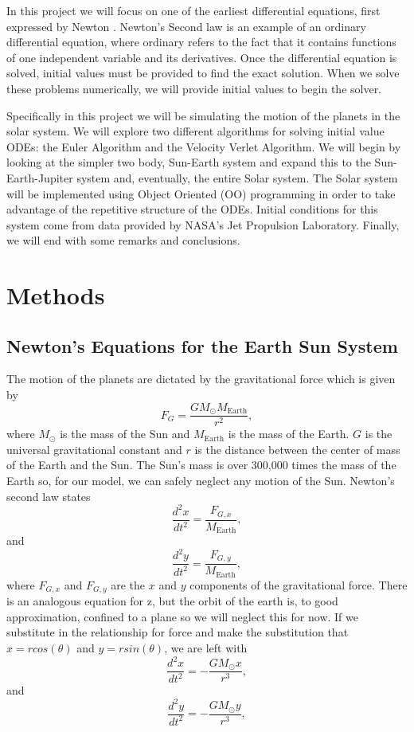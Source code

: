 \documentclass[%
oneside,                 %
final,                   %
10pt]{article}
\begin{document}
In this project we will focus on one of the earliest differential equations, first expressed by Newton \cite{LectureNotes}.  Newton's Second law is an example of an ordinary differential equation, where ordinary refers to the fact that it contains functions of one independent variable and its derivatives.  Once the differential equation is solved, initial values must be provided to find the exact solution.  When we solve these problems numerically, we will provide initial values to begin the solver. 

Specifically in this project we will be simulating the motion of the planets in the solar system.  We will explore two different algorithms for solving initial value ODEs: the Euler Algorithm and the Velocity Verlet Algorithm.  We will begin by looking at the simpler two body, Sun-Earth system and expand this to the Sun-Earth-Jupiter system and, eventually, the entire Solar system.  The Solar system will be implemented using Object Oriented (OO) programming in order to take advantage of the repetitive structure of the ODEs.  Initial conditions for this system come from data provided by NASA's Jet Propulsion Laboratory.  Finally, we will end with some remarks and conclusions.

\section{Methods}

\subsection{Newton's Equations for the Earth Sun System}

The motion of the planets are dictated by the gravitational force which is given by
\[
F_G=\frac{GM_{\odot}M_{\mathrm{Earth}}}{r^2},
\]
where $M_{\odot}$ is the mass of the Sun and $M_{\mathrm{Earth}}$ is the mass of the Earth.  $G$ is the universal gravitational constant and $r$ is the distance between the center of mass of the Earth and the Sun.  The Sun's mass is over 300,000 times the mass of the Earth so, for our model, we can safely neglect any motion of the Sun.  Newton's second law states 
\[
\frac{d^2x}{dt^2}=\frac{F_{G,x}}{M_{\mathrm{Earth}}},
\]
and 
\[
\frac{d^2y}{dt^2}=\frac{F_{G,y}}{M_{\mathrm{Earth}}},
\]
where $F_{G,x}$ and $F_{G,y}$ are the $x$ and $y$ components of the gravitational force.  There is an analogous equation for z, but the orbit of the earth is, to good approximation, confined to a plane so we will neglect this for now.  If we substitute in the relationship for force and make the substitution that $x=r cos(\theta)$ and $y=r sin(\theta)$, we are left with
\[
\frac{d^2x}{dt^2}=-\frac{GM_{\odot}x}{r^3},
\]
and 
\[
\frac{d^2y}{dt^2}=-\frac{GM_{\odot}y}{r^3},
\]
\end{document}
